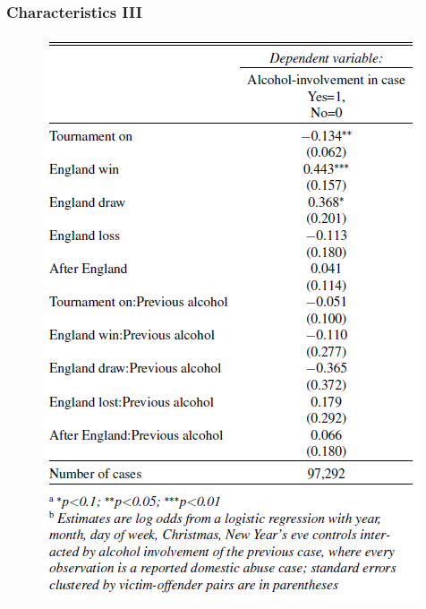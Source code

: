 \documentclass[hyperref={pdfpagelabels=false}]{beamer}
\begin{document}
\begin{frame}
\frametitle{Characteristics III}
\begin{center}
\begin{figure}
\includegraphics[scale=0.45]{append4.png}
\end{figure}
\end{center}
\end{frame}
\end{document}
